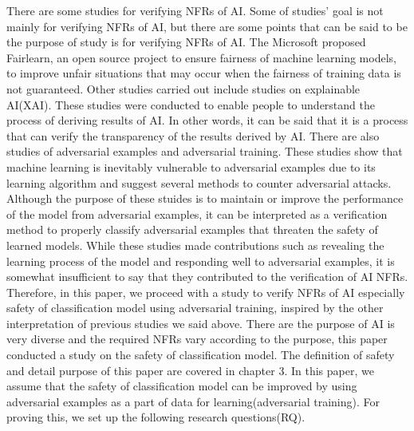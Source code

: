 \documentclass[journal,article,submit,moreauthors,pdftex]{Definitions/mdpi}
\begin{document}
There are some studies for verifying NFRs of AI. Some of studies' goal is not mainly for verifying NFRs of AI, but there are some points that can be said to be the purpose of study is for verifying NFRs of AI.
The Microsoft proposed Fairlearn\cite{fairness-microsoft}, an open source project to ensure fairness of machine learning models, to improve unfair situations that may occur when the fairness of training data is not guaranteed.
Other studies carried out include studies on explainable AI(XAI). These studies were conducted to enable people to understand the process of deriving results of AI.
In other words, it can be said that it is a process that can verify the transparency of the results derived by AI.
There are also studies of adversarial examples and adversarial training.
These studies show that machine learning is inevitably vulnerable to adversarial examples due to its learning algorithm and suggest several methods to counter adversarial attacks.
Although the purpose of these stuides is to maintain or improve the performance of the model from adversarial examples, it can be interpreted as a verification method to properly classify adversarial examples that threaten the safety of learned models.
While these studies made contributions such as revealing the learning process of the model and responding well to adversarial examples, it is somewhat insufficient to say that they contributed to the verification of AI NFRs.
Therefore, in this paper, we proceed with a study to verify NFRs of AI especially safety of classification model using adversarial training, inspired by the other interpretation of previous studies we said above.
There are the purpose of AI is very diverse and the required NFRs vary according to the purpose, this paper conducted a study on the safety of classification model. The definition of safety and detail purpose of this paper are covered in chapter 3.
In this paper, we assume that the safety of classification model can be improved by using adversarial examples as a part of data for learning(adversarial training).
For proving this, we set up the following research questions(RQ).
\end{document}
